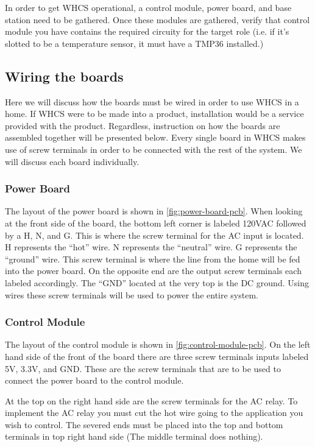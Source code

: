 In order to get WHCS operational, a control module, power board, and base station need to be gathered.
Once these modules are gathered, verify that control module you have contains the required
circuity for the target role (i.e. if it's slotted to be a temperature sensor, it must have a 
TMP36 installed.)

\subsection{Wiring the boards}
Here we will discuss how the boards must be wired in order to use WHCS in a
home. If WHCS were to be made into a product, installation would be a service
provided with the product.  Regardless, instruction on how the boards are
assembled together will be presented below. Every single board in
WHCS makes use of screw terminals in order to be connected with the rest of the
system. We will discuss each board individually.

\subsubsection{Power Board}
The layout of the power board is shown in \autoref{fig:power-board-pcb}. When looking at the
front side of the board, the bottom left corner is labeled 120VAC followed by a
H, N, and G. This is where the screw terminal for the AC input is located. H
represents the “hot” wire. N represents the “neutral” wire. G represents the
“ground” wire. This screw terminal is where the line from the home will be fed
into the power board. On the opposite end are the output screw terminals each
labeled accordingly. The “GND” located at the very top is the DC ground. Using
wires these screw terminals will be used to power the entire system.

\subsubsection{Control Module}
The layout of the control module is  shown in \autoref{fig:control-module-pcb}. On the left hand
side of the front of the board there are three screw terminals inputs labeled
5V, 3.3V, and GND. These are the screw terminals that are to be used to connect
the power board to the control module.

At the top on the right hand side are the screw terminals for the AC relay. To
implement the AC relay you must cut the hot wire going to the application you
wish to control. The severed ends must be placed into the top and bottom
terminals in top right hand side (The middle terminal does nothing).

